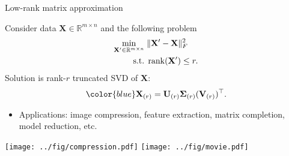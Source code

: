 \documentclass[10pt]{beamer}
\newcommand{\blue}{\color{blue}}
\newcommand{\bX}{\mathbf{X}}
\newcommand{\bS}{\mathbf{\Sigma}}
\newcommand{\bU}{\mathbf{U}}
\newcommand{\bV}{\mathbf{V}}
\newcommand{\rank}{\mathop{\textrm{\textup{rank}}}}
\newcommand{\st}{\mathop{\textrm{\textup{s.t.}}}}
\begin{document}
\begin{frame}{Low-rank matrix approximation}
      \begin{theorem}
        Consider data $\bX\in\mathbb{R}^{m\times n}$ and the following problem
          \begin{align*}
            \min_{\bX'\in\mathbb{R}^{m\times n}}\; &\Vert \bX'-\bX\Vert^2_F\\
            \st\;& \rank(\bX')\leq r.
          \end{align*}
          Solution is rank-$r$ truncated SVD of $\bX$:
          \begin{align*}
            \blue\bX_{(r)} = \bU_{(r)}\bS_{(r)}(\bV_{(r)})^\top.
          \end{align*}
      \end{theorem}
      \begin{itemize}
      \item Applications: image compression, feature extraction, matrix completion, {\blue model reduction}, etc.
      \end{itemize}
      \begin{center}
        \texttt{[image: ../fig/compression.pdf]}
        \texttt{[image: ../fig/movie.pdf]}
      \end{center}
\end{frame}



\end{document}
